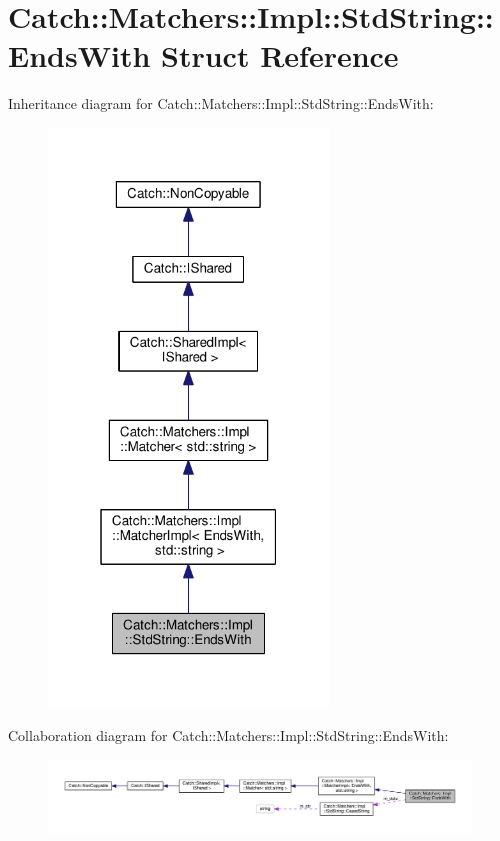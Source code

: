 \hypertarget{structCatch_1_1Matchers_1_1Impl_1_1StdString_1_1EndsWith}{}\section{Catch\+:\+:Matchers\+:\+:Impl\+:\+:Std\+String\+:\+:Ends\+With Struct Reference}
\label{structCatch_1_1Matchers_1_1Impl_1_1StdString_1_1EndsWith}


Inheritance diagram for Catch\+:\+:Matchers\+:\+:Impl\+:\+:Std\+String\+:\+:Ends\+With\+:
\nopagebreak
\begin{figure}[H]
\begin{center}
\leavevmode
\includegraphics[width=211pt]{structCatch_1_1Matchers_1_1Impl_1_1StdString_1_1EndsWith__inherit__graph}
\end{center}
\end{figure}


Collaboration diagram for Catch\+:\+:Matchers\+:\+:Impl\+:\+:Std\+String\+:\+:Ends\+With\+:
\nopagebreak
\begin{figure}[H]
\begin{center}
\leavevmode
\includegraphics[width=350pt]{structCatch_1_1Matchers_1_1Impl_1_1StdString_1_1EndsWith__coll__graph}
\end{center}
\end{figure}
